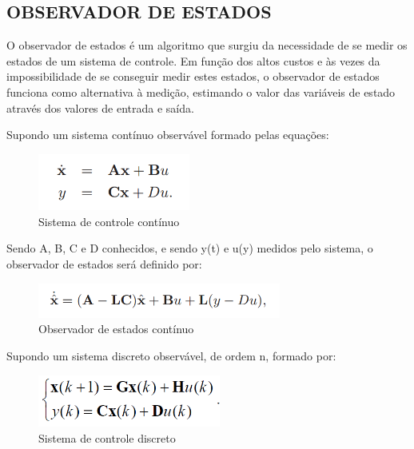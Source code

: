 \documentclass[a4paper,12pt]{article}
\begin{document}
\subsection{OBSERVADOR DE ESTADOS}

\hspace{4ex}O observador de estados é um algoritmo que surgiu da necessidade de se medir os estados de um sistema de controle. Em função dos altos custos e às vezes da impossibilidade de se conseguir medir estes estados, o observador de estados funciona como alternativa à medição, estimando o valor das variáveis de estado através dos valores de entrada e saída.

\vspace{0.7cm}
\hspace{6ex}{\bf 1. Caso contínuo}

Supondo um sistema contínuo observável formado pelas equações:
\newpage
\begin{figure}[H]
\centering
\includegraphics[width=5cm]{fotosLab5/sistema_continuo.png}
\caption{Sistema de controle contínuo}
\label{continuo}
\end{figure}

Sendo A, B, C e D conhecidos, e sendo y(t) e u(y) medidos pelo sistema, o observador de estados será definido por:

\begin{figure}[H]
\centering
\includegraphics[width=8cm]{fotosLab5/observador_continuo.png}
\caption{Observador de estados contínuo}
\label{continuo}
\end{figure}

\vspace{0.7cm}
\hspace{6ex}{\bf 2. Caso discreto}

Supondo um sistema discreto observável, de ordem n, formado por:

\begin{figure}[h]
\centering
\includegraphics[width=6cm]{fotosLab5/sistema_discreto.png}
\caption{Sistema de controle discreto}
\label{sist_discreto}
\end{figure}
\end{document}
